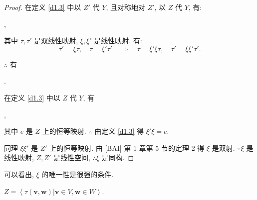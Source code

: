 \documentclass[color=black,device=normal,lang=cn,mode=geye]{elegantnote}
\begin{document}
\begin{proof}
    在定义 \ref{d1.3} 中以 $Z'$ 代 $Y$, 且对称地对 $Z'$, 以 $Z$ 代 $Y$, 有:
    \begin{center}
        ,
    \end{center}
    
    其中 $\tau,\tau'$ 是双线性映射, $\xi,\xi'$ 是线性映射. 有:
    \[\tau'=\xi\tau,\quad\tau=\xi'\tau'\quad\Rightarrow\quad\tau=\xi'\xi\tau,\quad\tau'=\xi\xi'\tau'.\]

    $\therefore$ 有
    \begin{center}
        .
    \end{center}
    
    在定义 \ref{d1.3} 中以 $Z$ 代 $Y$, 有
    \begin{center}
        ,
    \end{center}

    其中 $e$ 是 $Z$ 上的恒等映射. $\therefore$ 由定义 \ref{d1.3} 得 $\xi'\xi=e$.

    同理 $\xi\xi'$ 是 $Z'$ 上的恒等映射. 由 [BAI] 第 1 章第 5 节的定理 2 得 $\xi$ 是双射. $\because\xi$ 是线性映射, $Z,Z'$ 是线性空间, $\therefore\xi$ 是同构.
\end{proof}
可以看出, $\xi$ 的唯一性是很强的条件.
\begin{theorem}\label{t1.7}
    $Z=\left<\tau(\boldsymbol{v},\boldsymbol{w})|\boldsymbol{v}\in V,\boldsymbol{w}\in W\right>$.
\end{theorem}
\end{document}

